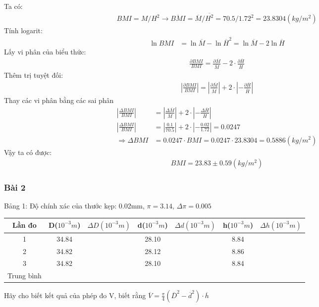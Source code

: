 \documentclass{article}
\begin{document}
Ta có:
\begin{align*}
    BMI = M / H^2 \rightarrow \overline{BMI} = \overline{M}/\overline{H^2} = 70.5/1.72^2 = 23.8304(kg/m^2)
\end{align*}
Tính logarit:
\begin{align*}
    \ln BMI & = \ln \overline{M} - \ln \overline{H}^2 = \ln \overline{M} - 2\ln \overline{H}
\end{align*}
Lấy vi phân của biểu thức:
\begin{align*}
    \frac{\partial BMI}{BMI} = \frac{\partial \overline{M}}{\overline{M}} - 2\cdot\frac{\partial\overline{H}}{\overline{H}}
\end{align*}
Thêm trị tuyệt đối:
\begin{align*}
    \left|\frac{\partial BMI}{BMI}\right| = \left|\frac{\partial \overline{M}}{\overline{M}}\right| + 2\cdot\left|-\frac{\partial\overline{H}}{\overline{H}}\right|
\end{align*}
Thay các vi phân bằng các sai phân
\begin{align*}
    \left|\frac{\Delta BMI}{BMI}\right| & = \left|\frac{\Delta \overline{M}}{\overline{M}}\right| + 2\cdot\left|-\frac{\Delta\overline{H}}{\overline{H}}\right| \\
    \left|\frac{\Delta BMI}{BMI}\right| & = \left|\frac{0.1}{70.5}\right| + 2\cdot\left|-\frac{0.02}{1.72}\right| = 0.0247                                      \\
    \Rightarrow \Delta BMI              & = 0.0247 \cdot BMI = 0.0247\cdot 23.8304 = 0.5886 (kg/m^2)
\end{align*}
Vậy ta có được:
\begin{align*}
    BMI = 23.83 \pm 0.59 (kg/m^2)
\end{align*}
\subsubsection*{Bài 2}
Bảng 1: Độ chính xác của thước kẹp: 0.02mm, $\pi = 3.14$, $\Delta \pi = 0.005$
\begin{center}
    \begin{tabular}{|c|c|c|c|c|c|c|}
        \hline
        Lần đo & D($10^{-3} m$) & $\Delta D(10^{-3} m)$ & d($10^{-3} m$) & $\Delta d(10^{-3} m)$ &  h($10^{-3} m$) & $\Delta h(10^{-3} m)$\\
        \hline
        1 & 34.84 & & 28.10 & & 8.84 & \\
        \hline
        2 & 34.82 & & 28.12 & & 8.86 & \\
        \hline 
        3 & 34.82 & & 28.10 & & 8.84 & \\
        \hline
        Trung bình & & & & & & \\
        \hline
    \end{tabular}
\end{center}
Hãy cho biết kết quả của phép đo V, biết rằng $\overline{V} = \frac{\pi}{4}(\overline{D}^2 - \overline{d}^2)\cdot\overline{h}$\\
\end{document}
